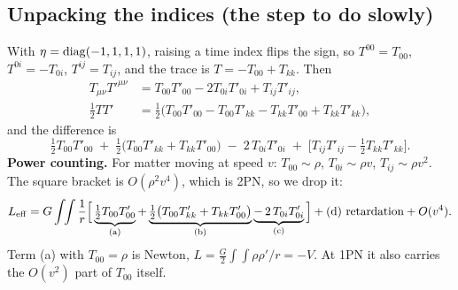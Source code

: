 \documentclass[11pt]{article}
\begin{document}
\subsection{Unpacking the indices (the step to do slowly)}
With $\eta={\rm diag}(-1,1,1,1)$, raising a time index flips the sign, so $T^{00}=T_{00}$, $T^{0i}=-T_{0i}$, $T^{ij}=T_{ij}$, and the trace is $T=-T_{00}+T_{kk}$. Then
\begin{align*}
T_{\mu\nu}T'^{\mu\nu}&=T_{00}T'_{00}-2T_{0i}T'_{0i}+T_{ij}T'_{ij},\\
\tfrac12TT'&=\tfrac12\big(T_{00}T'_{00}-T_{00}T'_{kk}-T_{kk}T'_{00}+T_{kk}T'_{kk}\big),
\end{align*}
and the difference is
\[
\tfrac12T_{00}T'_{00}\;+\;\tfrac12\big(T_{00}T'_{kk}+T_{kk}T'_{00}\big)\;-\;2\,T_{0i}T'_{0i}\;+\;\big[T_{ij}T'_{ij}-\tfrac12T_{kk}T'_{kk}\big].
\]
\textbf{Power counting.} For matter moving at speed $v$: $T_{00}\sim\rho$, $T_{0i}\sim\rho v$, $T_{ij}\sim\rho v^2$. The square bracket is $O(\rho^2v^4)$, which is 2PN, so we drop it:
\begin{equation}
L_{\rm eff}=G\int\!\!\int\frac1r\Big[\underbrace{\tfrac12T_{00}T'_{00}}_{\rm (a)}+\underbrace{\tfrac12\big(T_{00}T'_{kk}+T_{kk}T'_{00}\big)}_{\rm (b)}\underbrace{-\,2\,T_{0i}T'_{0i}}_{\rm (c)}\Big]+\text{(d) retardation}+O(v^4).
\label{eq:L1PN}
\end{equation}
Term (a) with $T_{00}=\rho$ is Newton, $L=\tfrac G2\int\!\!\int\rho\rho'/r=-V$. At 1PN it also carries the $O(v^2)$ part of $T_{00}$ itself.
\end{document}
